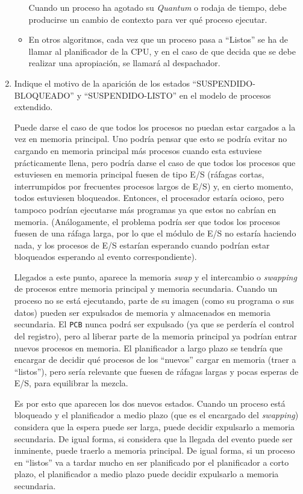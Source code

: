 \begin{ejercicio}
\begin{enumerate}
\begin{itemize}
            Cuando un proceso ha agotado su \emph{Quantum} o rodaja de tiempo, debe producirse un cambio de contexto para ver qué proceso ejecutar.

            \item En otros algoritmos, cada vez que un proceso pasa a ``Listos'' se ha de llamar al planificador de la CPU, y en el caso de que decida que se debe realizar una apropiación, se llamará al despachador.
        \end{itemize}
	
        
        \item Indique el motivo de la aparición de los estados ``SUSPENDIDO-BLOQUEADO'' y ``SUSPENDIDO-LISTO'' en el modelo de procesos extendido.

        Puede darse el caso de que todos los procesos no puedan estar cargados a la vez en memoria principal. Uno podría pensar que esto se podría evitar no cargando en memoria principal más procesos cuando esta estuviese prácticamente llena, pero podría darse el caso de que todos los procesos que estuviesen en memoria principal fuesen de tipo E/S (ráfagas cortas, interrumpidos por frecuentes procesos largos de E/S) y, en cierto momento, todos estuviesen bloqueados. Entonces, el procesador estaría ocioso, pero tampoco podrían ejecutarse más programas ya que estos no cabrían en memoria. (Análogamente, el problema podría ser que todos los procesos fuesen de una ráfaga larga, por lo que el módulo de E/S no estaría haciendo nada, y los procesos de E/S estarían esperando cuando podrían estar bloqueados esperando al evento correspondiente).

        Llegados a este punto, aparece la memoria \emph{swap} y el intercambio o \emph{swapping} de procesos entre memoria principal y memoria secundaria. Cuando un proceso no se está ejecutando, parte de su imagen (como su programa o sus datos) pueden ser expulsados de memoria y almacenados en memoria secundaria. El \verb|PCB| nunca podrá ser expulsado (ya que se perdería el control del registro), pero al liberar parte de la memoria principal ya podrían entrar nuevos procesos en memoria. El planificador a largo plazo se tendría que encargar de decidir qué procesos de los ``nuevos'' cargar en memoria (traer a ``listos''), pero sería relevante que fuesen de ráfagas largas y pocas esperas de E/S, para equilibrar la mezcla.

        Es por esto que aparecen los dos nuevos estados. Cuando un proceso está bloqueado y el planificador a medio plazo (que es el encargado del \emph{swapping}) considera que la espera puede ser larga, puede decidir expulsarlo a memoria secundaria. De igual forma, si considera que la llegada del evento puede ser inminente, puede traerlo a memoria principal. De igual forma, si un proceso en ``listos'' va a tardar mucho en ser planificado por el planificador a corto plazo, el planificador a medio plazo puede decidir expulsarlo a memoria secundaria.
    \end{enumerate}
\end{ejercicio}

